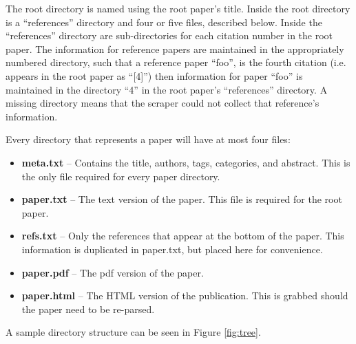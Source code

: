 \documentclass[10pt, conference, compsocconf]{IEEEtran}
\begin{document}
The root directory is named using the root paper's title. Inside the root
directory is a ``references'' directory and four or five files, described
below. Inside the ``references'' directory are sub-directories for each
citation number in the root paper. The information for reference papers are
maintained in the appropriately numbered directory, such that a reference paper
``foo'', is the fourth citation (i.e. appears in the root paper as ``[4]'')
then information for paper ``foo'' is maintained in the directory ``4'' in the
root paper's ``references'' directory. A missing directory
means that the scraper could not collect that reference's information.

Every directory that represents a paper will have at most four files:
\begin{itemize}
   \item \textbf{meta.txt}\footnotemark[1]{} -- Contains the title, authors,
                                                tags, categories, and abstract.
                                                This is the only file required
                                                for every paper directory.
   \item \textbf{paper.txt}\footnotemark[1]{} -- The text version of the paper.
                                                 This file is required for the
                                                 root paper.
   \item \textbf{refs.txt}\footnotemark[1]{} -- Only the references that appear
                                                at the bottom of the paper.
                                                This information is duplicated
                                                in paper.txt, but placed here
                                                for convenience.
   \item \textbf{paper.pdf} -- The pdf version of the paper.
   \item \textbf{paper.html} -- The HTML version of the publication. This is
                                grabbed should the paper need to be re-parsed.
\end{itemize}


A sample directory structure can be seen in Figure \ref{fig:tree}.
\end{document}
